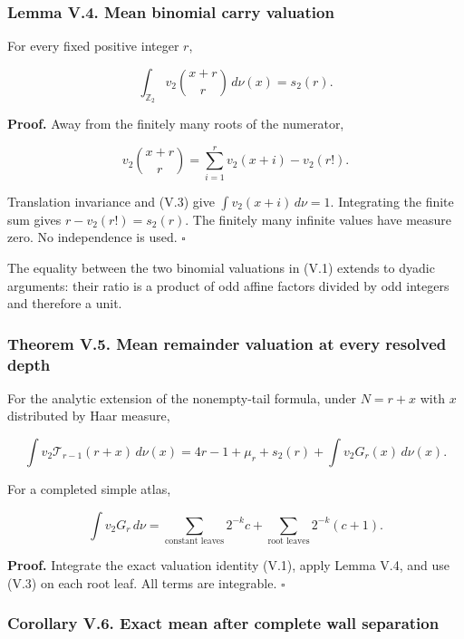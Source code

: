 \documentclass[11pt,letterpaper]{article}
\begin{document}
\subsubsection{Lemma V.4. Mean binomial carry valuation}\label{lemma-v.4.-mean-binomial-carry-valuation}

For every fixed positive integer \(r\),

\[
\boxed{
\int_{\mathbb Z_2}v_2\binom{x+r}{r}\,d\nu(x)=s_2(r).
} \tag{V.10}
\]

\textbf{Proof.} Away from the finitely many roots of the numerator,

\[
v_2\binom{x+r}{r}
=\sum_{i=1}^{r}v_2(x+i)-v_2(r!).
\]

Translation invariance and (V.3) give \(\int v_2(x+i)\,d\nu=1\). Integrating the finite sum gives \(r-v_2(r!)=s_2(r)\). The finitely many infinite values have measure zero. No independence is used. \(\square\)

The equality between the two binomial valuations in (V.1) extends to dyadic arguments: their ratio is a product of odd affine factors divided by odd integers and therefore a unit.

\subsubsection{Theorem V.5. Mean remainder valuation at every resolved depth}\label{theorem-v.5.-mean-remainder-valuation-at-every-resolved-depth}

For the analytic extension of the nonempty-tail formula, under \(N=r+x\) with \(x\) distributed by Haar measure,

\[
\boxed{
\int v_2\mathcal T_{r-1}(r+x)\,d\nu(x)
=4r-1+\mu_r+s_2(r)+\int v_2G_r(x)\,d\nu(x).
} \tag{V.11}
\]

For a completed simple atlas,

\[
\int v_2G_r\,d\nu
=\sum_{\text{constant leaves}}2^{-k}c
+\sum_{\text{root leaves}}2^{-k}(c+1). \tag{V.12}
\]

\textbf{Proof.} Integrate the exact valuation identity (V.1), apply Lemma V.4, and use (V.3) on each root leaf. All terms are integrable. \(\square\)

\subsubsection{Corollary V.6. Exact mean after complete wall separation}\label{corollary-v.6.-exact-mean-after-complete-wall-separation}
\end{document}
